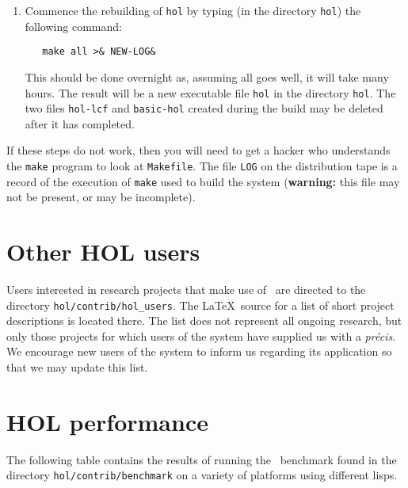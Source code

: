 {\begin{enumerate}
{\small\begin{alltt}
   Liszt=/usr/bin/liszt
   LisztComm=/usr/bin/liszt
\end{alltt}}

Ignore this step if you are not using Franz Lisp.

\item Commence the rebuilding of {\small\tt hol} by typing (in the directory
{\small\tt hol}) the following command:

{\small\begin{verbatim}
   make all >& NEW-LOG&
\end{verbatim}}

This should be done overnight as, assuming all goes well, it will take many hours.
The result will be a new executable file {\small\tt hol} in the directory
{\small\tt hol}. The two files {\small\tt hol-lcf} and {\small\tt basic-hol}
created during the build may be deleted after it has completed.

\end{enumerate}

If these steps do not work, then you will need to get a hacker who understands the
{\small\tt make} program to look at {\small\tt Makefile}. The file {\small\tt LOG}
on the distribution tape is a record of the execution of {\small\tt make} used
to build the system ({\bf warning:} this file may not be present, or may be
incomplete).

\section{Other HOL users}

Users interested in research projects that make use of \HOL\ are directed
to the directory {\small\tt hol/contrib/hol\_users}.  The \LaTeX\ source for a list
of short project descriptions is located there.  The list does not represent
all ongoing research, but only those projects for which users of the system 
have supplied us with a {\it pr\'{e}cis}.  We encourage new users of the 
system to inform us regarding its application so that we may update this list.

\section{HOL performance} \label{performance}

The following table contains the results of running the \HOL\ benchmark found
in the directory {\small\tt hol/contrib/benchmark} on a variety of platforms 
using different lisps.  

}
